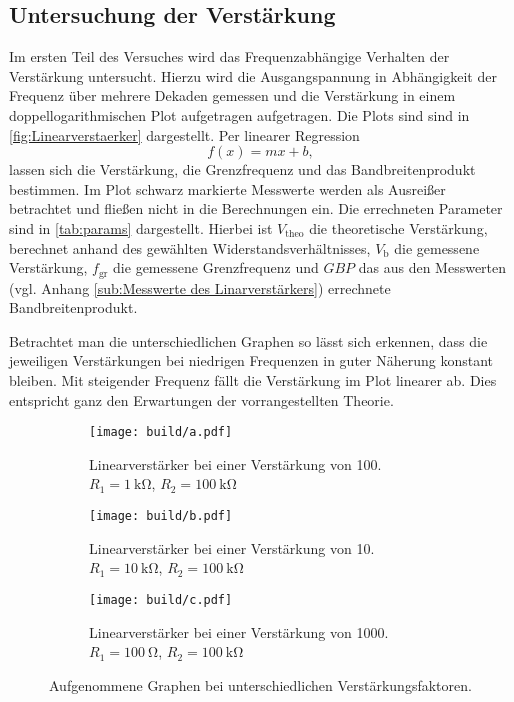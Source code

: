 \subsection{Untersuchung der Verstärkung}
Im ersten Teil des Versuches wird das Frequenzabhängige Verhalten der Verstärkung untersucht.
Hierzu wird die Ausgangspannung in Abhängigkeit der Frequenz über mehrere Dekaden gemessen 
und die Verstärkung in einem doppellogarithmischen Plot aufgetragen aufgetragen.
Die Plots sind sind in \autoref{fig:Linearverstaerker} dargestellt.
Per linearer Regression
\begin{equation*}
    f(x) = mx+b,
\end{equation*}
lassen sich die Verstärkung, die Grenzfrequenz und das Bandbreitenprodukt bestimmen.
Im Plot schwarz markierte Messwerte werden als Ausreißer betrachtet 
und fließen nicht in die Berechnungen ein.
Die errechneten Parameter sind in \autoref{tab:params} dargestellt.
Hierbei ist $V_\text{theo}$ die theoretische Verstärkung, berechnet anhand des gewählten 
Widerstandsverhältnisses, $V_\text{b}$ die gemessene Verstärkung, $f_\text{gr}$ die 
gemessene Grenzfrequenz und $GBP$ das aus den Messwerten 
(vgl. Anhang \ref{sub:Messwerte des Linarverstärkers}) errechnete Bandbreitenprodukt.

\FloatBarrier
Betrachtet man die unterschiedlichen Graphen so lässt sich erkennen, dass
die jeweiligen Verstärkungen bei niedrigen Frequenzen in guter Näherung konstant
bleiben. Mit steigender Frequenz fällt die Verstärkung im Plot linearer ab.
Dies entspricht ganz den Erwartungen der vorrangestellten Theorie.
\begin{figure}
    \centering
    \begin{subfigure}[b]{0.6\textwidth}
        \centering
        \texttt{[image: build/a.pdf]}
        \caption{Linearverstärker bei einer Verstärkung von 100.\\ $R_1 = \SI{1}{\kilo\ohm}$,
        $R_2 = \SI{100}{\kilo\ohm}$ }
        \label{fig:a}
    \end{subfigure}
    \begin{subfigure}[b]{0.6\textwidth}
        \centering
        \texttt{[image: build/b.pdf]}
        \caption{Linearverstärker bei einer Verstärkung von 10.\\ $R_1 = \SI{10}{\kilo\ohm}$,
        $R_2 = \SI{100}{\kilo\ohm}$ }
        \label{fig:b}
    \end{subfigure}    
    \begin{subfigure}[b]{0.6\textwidth}
        \centering
        \texttt{[image: build/c.pdf]}
        \caption{Linearverstärker bei einer Verstärkung von 1000.\\ $R_1 = \SI{100}{\ohm}$,
        $R_2 = \SI{100}{\kilo\ohm}$ }
        \label{fig:c}
    \end{subfigure}
       \caption{Aufgenommene Graphen bei unterschiedlichen Verstärkungsfaktoren.}
       \label{fig:Linearverstaerker}
\end{figure}
\FloatBarrier

